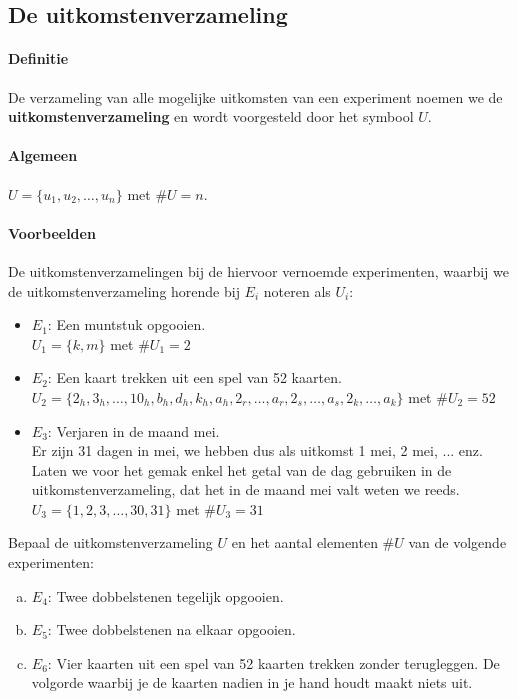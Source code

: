 \documentclass[12pt,twoside]{article}
\begin{document}
\subsection{De uitkomstenverzameling}

\paragraph*{Definitie}
De verzameling van alle mogelijke uitkomsten van een experiment noemen we de
{\bf uitkomstenverzameling} en wordt voorgesteld door het symbool $U$.

\paragraph*{Algemeen}
$U=\{u_1, u_2, \ldots, u_n\}$ met $\#U=n$.

\paragraph*{Voorbeelden} De uitkomstenverzamelingen bij de hiervoor vernoemde experimenten, waarbij we de uitkomstenverzameling horende bij $E_i$ noteren als $U_i$:
\begin{itemize}
  \item $E_1$: Een muntstuk opgooien.\\
  $U_1 = \{k,m\}$ met $\#U_1=2$
  \item $E_2$: Een kaart trekken uit een spel van 52 kaarten.\\
  $U_2 = \{2_h, 3_h, \ldots , 10_h, b_h, d_h, k_h, a_h, 2_r, \ldots, a_r, 2_s, \ldots, a_s, 2_k, \ldots, a_k \}$ met $\#U_2=52$
  \item $E_3$: Verjaren in de maand mei.\\
  Er zijn 31 dagen in mei, we hebben dus als uitkomst 1 mei, 2 mei, ... enz. Laten we voor het gemak enkel het getal van de dag gebruiken in de uitkomstenverzameling, dat het in de maand mei valt weten we reeds.\\
  $U_3 = \{1, 2, 3, \ldots, 30, 31\}$ met $\#U_3=31$
\end{itemize}

\begin{oefening}
Bepaal de uitkomstenverzameling $U$ en het aantal elementen $\#U$ van de volgende experimenten:
\begin{enumerate}[(a)]
  \item $E_4$: Twee dobbelstenen tegelijk opgooien.
  \item $E_5$: Twee dobbelstenen na elkaar opgooien.
  \item $E_6$: Vier kaarten uit een spel van 52 kaarten trekken zonder terugleggen. De volgorde waarbij je de kaarten nadien in je hand houdt maakt niets uit.
\end{enumerate}
\end{oefening}
\end{document}
